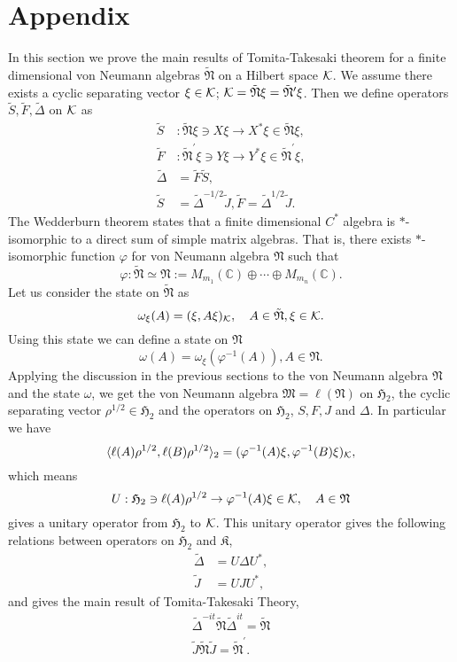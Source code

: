 \section{Appendix}
In this section we prove the main results of Tomita-Takesaki theorem for a finite dimensional
von Neumann algebras $\tilde{\mathfrak{N}}$ on a Hilbert space $\cal{K}$.
We assume there exists a cyclic separating vector $\xi\in {\cal K}$;
$\cal{K}=\tilde{\mathfrak{N}}\xi=\tilde{\mathfrak{N}}^\prime\xi$.
Then we define operators $\tilde{S},\tilde{F},\tilde{\Delta}$ on $\cal{K}$ as
\begin{equation}
\begin{split}
\tilde{S}&:\tilde{\mathfrak{N}}\xi\ni X\xi \to X^\ast \xi \in \tilde{\mathfrak{N}}\xi,\\
\tilde{F}&:\tilde{\mathfrak{N}}^\prime\xi\ni Y\xi \to Y^\ast \xi \in \tilde{\mathfrak{N}}^\prime\xi,\\
\tilde{\Delta}&=\tilde{F}\tilde{S},\\
\tilde{S}&=\tilde{\Delta}^{-1/2}\tilde{J}, \tilde{F}=\tilde{\Delta}^{1/2}\tilde{J}.
\end{split}
\end{equation}
The Wedderburn theorem states that a finite dimensional $C^{\ast}$ algebra is  $\ast$-isomorphic to a direct sum of simple matrix algebras. That is, there exists $\ast$-isomorphic function $\varphi$ for von Neumann algebra $\mathfrak{N}$ such that
$$
\varphi:\tilde{\mathfrak{N}}\simeq \mathfrak{N}:=M_{m_1}(\mathbb{C})\oplus \cdots \oplus M_{m_n}(\mathbb{C}).
$$
Let us consider the state on $\tilde{\mathfrak{N}}$ as
$$
\omega_\xi(A)=(\xi,A\xi)_{{\cal K}},\quad A\in \tilde{\mathfrak{N}},\xi\in {\cal K}.
$$
Using this state we can define a state on $\mathfrak{N}$
$$
\omega(A)=\omega_\xi(\varphi^{-1}(A)),A\in \mathfrak{N}.
$$
Applying the discussion in the previous sections to the von Neumann algebra $\mathfrak{N}$ and the state
$\omega$, we get
the von Neumann algebra $\mathfrak{M}=\ell (\mathfrak{N})$ on  
$\mathfrak{H}_2$, the cyclic separating vector $\rho^{1/2}\in \mathfrak{H}_2$
and the operators on $\mathfrak{H}_2$, $S, F, J$ and $\Delta$.
In particular we have
$$
\langle \ell(A)\rho^{1/2},\ell( B)\rho^{1/2}\rangle_2=(\varphi^{-1}(A)\xi,\varphi^{-1}(B)\xi)_{\cal K},
$$
which means
$$
U:\mathfrak{H}_2\ni\ell(A)\rho^{1/2}\to \varphi^{-1}(A)\xi\in {\cal K}, \quad A\in \mathfrak{N}
$$
gives a unitary operator from $\mathfrak{H}_2$ to ${\cal K}$.
This unitary operator gives the following relations between operators on $\mathfrak{H}_2$ and $\mathfrak{K}$,
\begin{equation}
\begin{split}
\tilde{\Delta}&=U\Delta U^{\ast},\\
\tilde{J}&=UJU^\ast ,
\end{split}
\end{equation}
and gives the main result of Tomita-Takesaki Theory,
\begin{equation}
\begin{split}
\tilde{\Delta}^{-it}\tilde{\mathfrak{N}}\tilde{\Delta}^{it}=\tilde{\mathfrak{N}}\\
\tilde{J}\tilde{\mathfrak{N}}\tilde{J}=\tilde{\mathfrak{N}}^\prime.
\end{split}
\end{equation}


